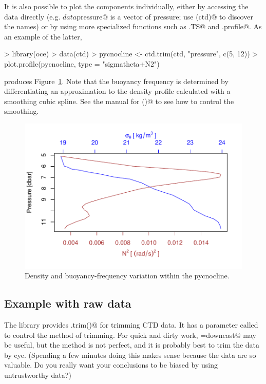 \documentclass{article}
\begin{document}
It is also possible to plot the components individually, either by accessing the data directly
(e.g. \verb@ctd$data$pressure@ is a vector of pressure; use \verb@names(ctd)@ to discover the
names) or by using more specialized functions such as \verb@plot.TS@ and \verb@plot.profile@.
As an example of the latter,
\begin{Schunk}
\begin{Sinput}
> library(oce)
> data(ctd)
> pycnocline <- ctd.trim(ctd, "pressure", c(5, 12))
> plot.profile(pycnocline, type = "sigmatheta+N2")
\end{Sinput}
\end{Schunk}
produces Figure~\ref{fig:ctdpycnocline}. Note that the buoyancy frequency is determined by
differentiating an approximation to the density profile calculated with a smoothing cubic
spline. See the manual for ()@ to see how to control the smoothing.
\begin{figure}
\begin{center}
\includegraphics{oce-ctdpycnoclinefig}
\end{center}
\caption{Density and buoyancy-frequency variation within the pycnocline.}
\label{fig:ctdpycnocline}
\end{figure}


\subsection{Example with raw data}

The \verb@oce@ library provides \verb@ctd.trim()@ for trimming CTD data. It has a parameter called \verb@method@
to control the method of trimming. For quick and dirty work, \verb@method=downcast@ may be useful, but the method
is not perfect, and it is probably best to trim the data by eye. (Spending a few minutes doing this makes sense
because the data are so valuable. Do you really want your conclusions to be biased by using untrustworthy data?)
\end{document}
